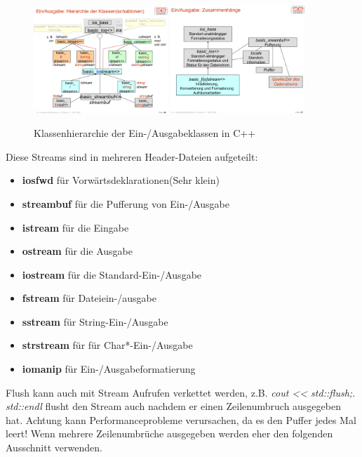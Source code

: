 \documentclass[12pt]{scrartcl}
\begin{document}
\begin{figure}[H]
	\centering
	\includegraphics[width=0.45\textwidth]{images/cpp_1.png}
	\includegraphics[width=0.45\textwidth]{images/cpp_2.png}
	\caption{Klassenhierarchie der Ein-/Ausgabeklassen in C++}
\end{figure}

Diese Streams sind in mehreren Header-Dateien aufgeteilt:
\begin{itemize}
	\item \textbf{iosfwd} für Vorwärtsdeklarationen(Sehr klein)
	\item \textbf{streambuf} für die Pufferung von Ein-/Ausgabe
	\item \textbf{istream} für die Eingabe
	\item \textbf{ostream} für die Ausgabe
	\item \textbf{iostream} für die Standard-Ein-/Ausgabe
	\item \textbf{fstream} für Dateiein-/ausgabe
	\item \textbf{sstream} für String-Ein-/Ausgabe
	\item \textbf{strstream} für für Char*-Ein-/Ausgabe
	\item \textbf{iomanip} für Ein-/Ausgabeformatierung
\end{itemize}

Flush kann auch mit Stream Aufrufen verkettet werden, z.B. \emph{cout << std::flush;}.
\emph{std::endl} flusht den Stream auch nachdem er einen Zeilenumbruch ausgegeben hat.
Achtung kann Performanceprobleme verursachen, da es den Puffer jedes Mal leert! Wenn mehrere
Zeilenumbrüche ausgegeben werden eher den folgenden Ausschnitt verwenden.
\end{document}
